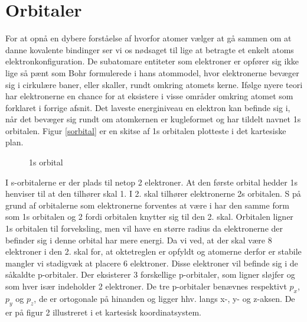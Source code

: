 \section{Orbitaler}
For at opnå en dybere forståelse af hvorfor atomer vælger at gå sammen om at danne kovalente bindinger ser vi os nødsaget til lige at betragte et enkelt atoms elektronkonfiguration. De subatomare entiteter som elektroner er opfører sig ikke lige så pænt som Bohr formulerede i hans atommodel, hvor elektronerne bevæger sig i cirkulære baner, eller skaller, rundt omkring atomets kerne. Ifølge nyere teori har elektronerne en chance for at eksistere i visse områder omkring atomet som forklaret i forrige afsnit. Det laveste energiniveau en elektron kan befinde sig i, når det bevæger sig rundt om atomkernen er kugleformet og har tildelt navnet 1s orbitalen. Figur \ref{sorbital} er en skitse af 1s orbitalen plotteste i det kartesiske plan. 

\begin{figure}[ht!]
  \centering
  \caption{1s orbital} 
  \end{figure}\label{sorbital}
  
  I s-orbitalerne er der plads til netop 2 elektroner. At den første orbital hedder 1s henviser til at den tilhører skal 1. I 2. skal tilhører elektronerne 2s orbitalen. S på grund af orbitalerne som elektronerne forventes at være i har den samme form som 1s orbitalen og 2 fordi orbitalen knytter sig til den 2. skal. Orbitalen ligner 1s orbitalen til forveksling, men vil have en større radius da elektronerne der befinder sig i denne orbital har mere energi. Da vi ved, at der skal være 8 elektroner i den 2. skal for, at oktetreglen er opfyldt og atomerne derfor er stabile mangler vi stadigvæk at placere 6 elektroner. Disse elektroner vil befinde sig i de såkaldte p-orbitaler. Der eksisterer 3 forskellige p-orbitaler, som ligner sløjfer og som hver især indeholder 2 elektroner. De tre p-orbitaler benævnes respektivt $p_x$, $p_y$ og $p_z$, de er ortogonale på hinanden og ligger hhv. langs x-, y- og z-aksen. De er på figur 2 illustreret i et kartesisk koordinatsystem.
  
